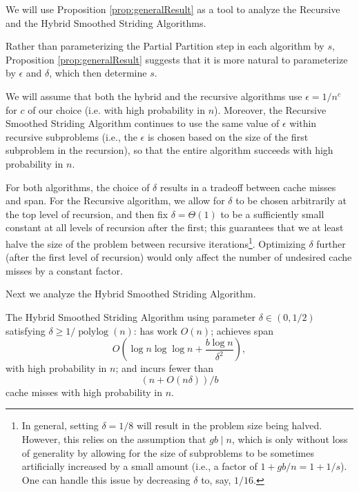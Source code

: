 \documentclass[twoside,leqno,twocolumn]{article}
\newcommand{\polylog}{\operatorname{polylog}}
\begin{document}
We will use Proposition \ref{prop:generalResult} as a tool to analyze the Recursive and the Hybrid Smoothed Striding Algorithms.

Rather than parameterizing the Partial Partition step in each algorithm by $s$, Proposition \ref{prop:generalResult} suggests that it is more natural to parameterize by $\epsilon$ and $\delta$, which then determine $s$.

We will assume that both the hybrid and the recursive algorithms use $\epsilon = 1/n^c$ for $c$ of our choice (i.e. with high probability in $n$). Moreover, the Recursive Smoothed Striding Algorithm continues to use the same value of $\epsilon$ within recursive subproblems (i.e., the $\epsilon$ is chosen based on the size of the first subproblem in the recursion), so that the entire algorithm succeeds with high probability in $n$.

For both algorithms, the choice of $\delta$ results in a tradeoff between cache misses and span. For the Recursive algorithm, we allow for $\delta$ to be chosen arbitrarily at the top level of recursion, and then fix $\delta  = \Theta(1)$ to be a sufficiently small constant at all levels of recursion after the first; this guarantees that we at least halve the size of the problem between recursive iterations\footnote{In general, setting $\delta = 1/8$ will result in the problem size being halved. However, this relies on the assumption that $gb \mid n$, which is only without loss of generality by allowing for the size of subproblems to be sometimes artificially increased by a small amount (i.e., a factor of $1 + gb / n = 1 + 1/s$). One can handle this issue by decreasing $\delta$ to, say, $1/16$.}. Optimizing $\delta$ further (after the first level of recursion) would only affect the number of undesired cache misses by a constant factor.




Next we analyze the Hybrid Smoothed Striding Algorithm.
\begin{theorem}
	\label{thm:fullPartition}
	The Hybrid Smoothed Striding Algorithm using parameter $\delta\in(0,1/2)$ satisfying $\delta \ge 1/\polylog(n)$: has work $O(n)$; achieves span
  $$O\left(\log n \log\log n +\frac{b\log n}{\delta^2}\right),$$
with high probability in $n$; and incurs fewer than 
$$(n+O(n\delta))/b$$
cache misses with high probability in $n$.
\end{theorem}
\end{document}
